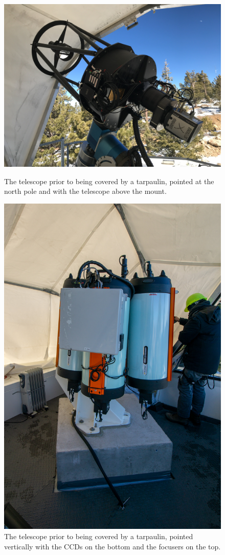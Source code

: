 \begin{enumerate}
\begin{figure}
\ifcoatli
\begin{center}
\includegraphics[width=0.8\linewidth]{figures/tarpaulin-coatli-before.jpg}
\end{center}
\caption{The telescope prior to being covered by a tarpaulin, pointed at the north pole and with the telescope above the mount. }
\fi
\ifddoti
\begin{center}
\includegraphics[width=0.8\linewidth]{figures/tarpaulin-ddoti-before.jpg}
\end{center}
\caption{The telescope prior to being covered by a tarpaulin, pointed vertically with the CCDs on the bottom and the focusers on the top. }
\fi
\label{figure:tarpaulin-before}
\end{figure}


\end{enumerate}
